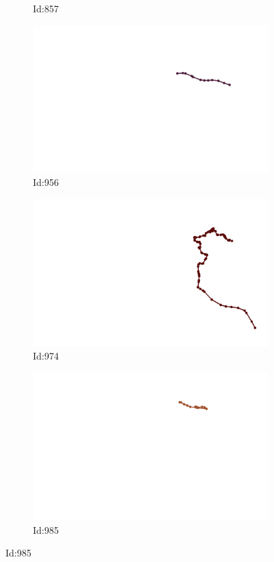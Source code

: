 \documentclass[12pt,twoside]{report}
\begin{document}
\begin{figure}
\begin{subfigure}[b]{0.20\textwidth}
\caption{Id:857}
\end{subfigure}
\begin{subfigure}[b]{0.20\textwidth}
\centering
\includegraphics[width=\textwidth]{../trajectories/956.png}
\caption{Id:956}
\end{subfigure}
\begin{subfigure}[b]{0.20\textwidth}
\centering
\includegraphics[width=\textwidth]{../trajectories/974.png}
\caption{Id:974}
\end{subfigure}
\begin{subfigure}[b]{0.20\textwidth}
\centering
\includegraphics[width=\textwidth]{../trajectories/985.png}
\caption{Id:985}
\end{subfigure}
\end{figure}
\end{document}
